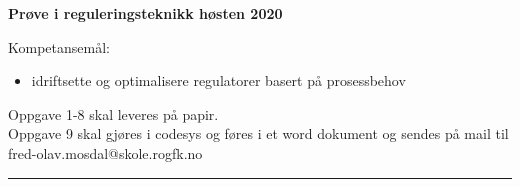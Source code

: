 \centerline{\bf Prøve i reguleringsteknikk høsten 2020}  \bigskip

Kompetansemål:
\begin{itemize}[noitemsep]

	\item idriftsette og optimalisere regulatorer basert på prosessbehov
\end{itemize}

Oppgave 1-8 skal leveres på papir. \\
Oppgave 9 skal gjøres i codesys og føres i et word  dokument og sendes på mail til fred-olav.mosdal@skole.rogfk.no\\

\bigskip 
\hrule
\vfil \eject
